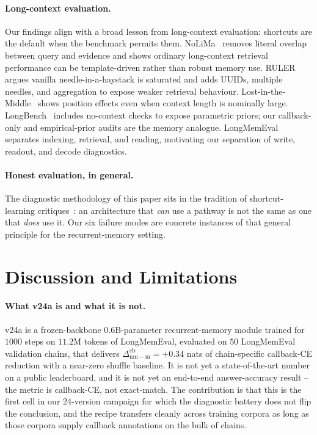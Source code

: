 \documentclass[11pt]{article}
\newcommand{\dnm}{\Delta_{\mathrm{nm{-}m}}}
\begin{document}
\paragraph{Long-context evaluation.}
Our findings align with a broad lesson from long-context evaluation:
shortcuts are the default when the benchmark permits them.
NoLiMa~\citep{modarressi2025nolima} removes literal overlap between
query and evidence and shows ordinary long-context retrieval
performance can be template-driven rather than robust memory use.
RULER~\citep{hsieh2024ruler} argues vanilla needle-in-a-haystack is
saturated and adds UUIDs, multiple needles, and aggregation to expose
weaker retrieval behaviour. Lost-in-the-Middle~\citep{liu2024lostmiddle}
shows position effects even when context length is nominally large.
LongBench~\citep{bai2024longbench} includes no-context checks to
expose parametric priors; our callback-only and empirical-prior
audits are the memory analogue.
LongMemEval~\citep{yu2025longmemeval} separates indexing, retrieval,
and reading, motivating our separation of write, readout, and decode
diagnostics.

\paragraph{Honest evaluation, in general.}
The diagnostic methodology of this paper sits in the tradition of
shortcut-learning critiques~\citep{geirhos2020shortcut}: an
architecture that \emph{can} use a pathway is not the same as one
that \emph{does} use it. Our six failure modes are concrete instances
of that general principle for the recurrent-memory setting.

\section{Discussion and Limitations}
\label{sec:discussion}

\paragraph{What v24a is and what it is not.}
v24a is a frozen-backbone $0.6$B-parameter recurrent-memory module
trained for $1000$ steps on $11.2$M tokens of LongMemEval, evaluated
on $50$ LongMemEval validation chains, that delivers
$\dnm^{\mathrm{cb}} = +0.34$ nats of chain-specific callback-CE
reduction with a near-zero shuffle baseline. It is not yet a
state-of-the-art number on a public leaderboard, and it is not yet
an end-to-end answer-accuracy result -- the metric is callback-CE,
not exact-match. The contribution is that this is the first cell in
our 24-version campaign for which the diagnostic battery does not
flip the conclusion, and the recipe transfers cleanly across
training corpora as long as those corpora supply callback annotations
on the bulk of chains.
\end{document}
